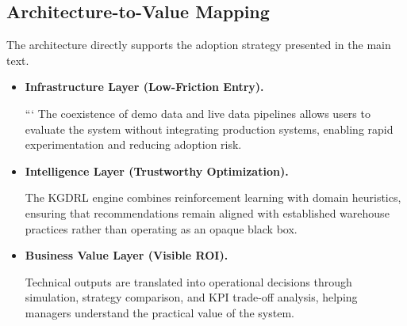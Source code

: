 \subsection*{Architecture-to-Value Mapping}

The architecture directly supports the adoption strategy presented in the main text.

\begin{itemize}
\item \textbf{Infrastructure Layer (Low-Friction Entry).}

```
The coexistence of demo data and live data pipelines allows users to evaluate the system without integrating production systems, enabling rapid experimentation and reducing adoption risk.

\item \textbf{Intelligence Layer (Trustworthy Optimization).}

The KGDRL engine combines reinforcement learning with domain heuristics, ensuring that recommendations remain aligned with established warehouse practices rather than operating as an opaque black box.

\item \textbf{Business Value Layer (Visible ROI).}

Technical outputs are translated into operational decisions through simulation, strategy comparison, and KPI trade-off analysis, helping managers understand the practical value of the system.


\end{itemize}




